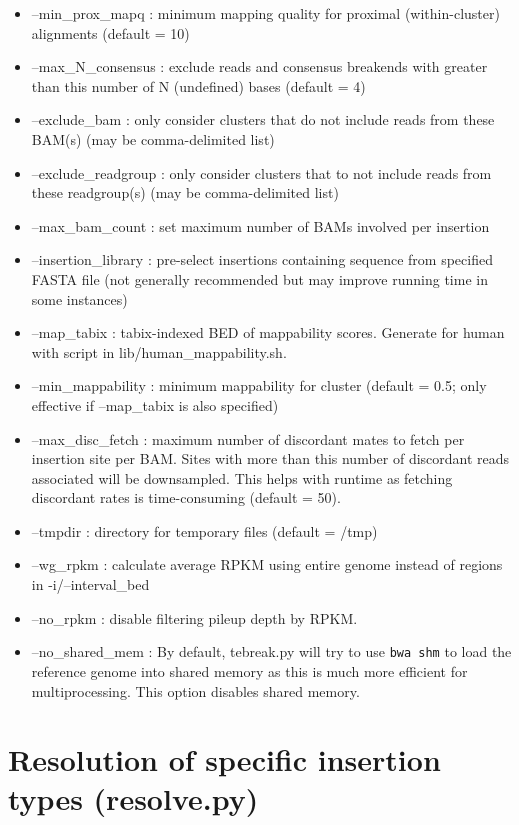 \documentclass[letterpaper,11pt]{article}
\begin{document}
\begin{itemize}
\item --min\_prox\_mapq : minimum mapping quality for proximal (within-cluster) alignments (default = 10)
\item --max\_N\_consensus : exclude reads and consensus breakends with greater than this number of N (undefined) bases (default = 4)
\item --exclude\_bam : only consider clusters that do not include reads from these BAM(s) (may be comma-delimited list)
\item --exclude\_readgroup : only consider clusters that to not include reads from these readgroup(s) (may be comma-delimited list)
\item --max\_bam\_count : set maximum number of BAMs involved per insertion
\item --insertion\_library : pre-select insertions containing sequence from specified FASTA file (not generally recommended but may improve running time in some instances)
\item --map\_tabix : tabix-indexed BED of mappability scores. Generate for human with script in lib/human\_mappability.sh.
\item --min\_mappability : minimum mappability for cluster (default = 0.5; only effective if --map\_tabix is also specified)
\item --max\_disc\_fetch : maximum number of discordant mates to fetch per insertion site per BAM. Sites with more than this number of discordant reads associated will be downsampled. This helps with runtime as fetching discordant rates is time-consuming (default = 50).
\item --tmpdir : directory for temporary files (default = /tmp)
\item --wg\_rpkm : calculate average RPKM using entire genome instead of regions in -i/--interval\_bed
\item --no\_rpkm : disable filtering pileup depth by RPKM.
\item --no\_shared\_mem : By default, tebreak.py will try to use \texttt{bwa shm} to load the reference genome into shared memory as this is much more efficient for multiprocessing. This option disables shared memory.

\end{itemize}


\section{Resolution of specific insertion types (resolve.py)}
\end{document}
